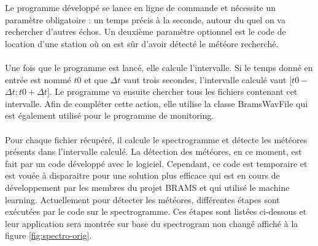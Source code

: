 \documentclass[11pt]{article}
\begin{document}
Le programme développé se lance en ligne de commande et nécessite un paramètre obligatoire : un temps précis à la seconde, autour du quel on va rechercher d'autres échos.
Un deuxième paramètre optionnel est le code de location d'une station où on est sûr d'avoir détecté le météore recherché.\\
\\
Une fois que le programme est lancé, elle calcule l'intervalle.
Si le temps donné en entrée est nommé \(t0\) et que $\Delta$\(t\) vaut trois secondes, l'intervalle calculé vaut \([t0 - \)$\Delta$\(t ; t0 + \)$\Delta$\(t]\).
Le programme va ensuite chercher tous les fichiers contenant cet intervalle.
Afin de compléter cette action, elle utilise la classe BramsWavFile qui est également utilisé pour le programme de monitoring.\\
\\
Pour chaque fichier récupéré, il calcule le spectrogramme et détecte les météores présents dans l'intervalle calculé.
La détection des météores, en ce moment, est fait par un code développé avec le logiciel.
Cependant, ce code est temporaire et est vouée à disparaitre pour une solution plus efficace qui est en cours de développement par les membres du projet BRAMS et qui utilisé le machine learning.
Actuellement pour détecter les météores, différentes étapes sont exécutées par le code sur le spectrogramme.
Ces étapes sont listées ci-dessous et leur application sera montrée sur base du spectrogram non changé affiché à la figure \ref{fig:spectro-orig}.
\end{document}
